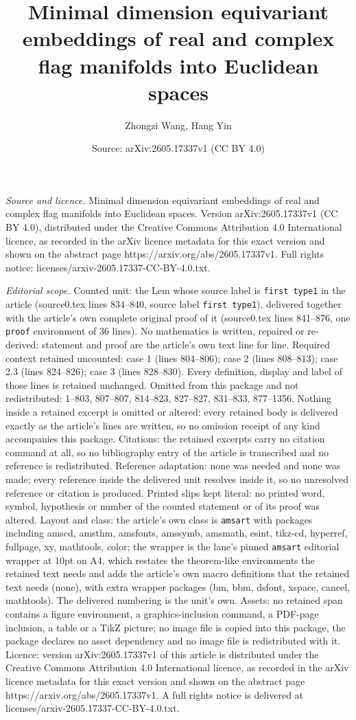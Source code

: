 \documentclass[10pt,a4paper]{amsart}
\title[Minimal dimension equivariant embeddings of real and complex]{Minimal dimension equivariant embeddings of real and complex flag manifolds into Euclidean spaces}
\author{Zhongzi Wang, Hang Yin}
\date{Source: arXiv:2605.17337v1 (CC BY 4.0)}
\begin{document}
\maketitle

\noindent\emph{Source and licence.} Minimal dimension equivariant embeddings of real and complex flag manifolds into Euclidean spaces. Version arXiv:2605.17337v1 (CC BY 4.0), distributed under the Creative Commons Attribution 4.0 International licence, as recorded in the arXiv licence metadata for this exact version and shown on the abstract page https://arxiv.org/abs/2605.17337v1. Full rights notice: licenses/arxiv-2605.17337-CC-BY-4.0.txt.\par\smallskip

\noindent\textit{Editorial scope.} Counted unit: the Lem whose source label is \texttt{first type1} in the article (source0.tex lines 834--840, source label \texttt{first type1}), delivered together with the article's own complete original proof of it (source0.tex lines 841--876, one \texttt{proof} environment of 36 lines). No mathematics is written, repaired or re-derived: statement and proof are the article's own text line for line. Required context retained uncounted: case 1 (lines 804--806); case 2 (lines 808--813); case 2.3 (lines 824--826); case 3 (lines 828--830). Every definition, display and label of those lines is retained unchanged. Omitted from this package and not redistributed: 1--803, 807--807, 814--823, 827--827, 831--833, 877--1356. Nothing inside a retained excerpt is omitted or altered: every retained body is delivered exactly as the article's lines are written, so no omission receipt of any kind accompanies this package. Citations: the retained excerpts carry no citation command at all, so no bibliography entry of the article is transcribed and no reference is redistributed. Reference adaptation: none was needed and none was made; every reference inside the delivered unit resolves inside it, so no unresolved reference or citation is produced. Printed slips kept literal: no printed word, symbol, hypothesis or number of the counted statement or of its proof was altered. Layout and class: the article's own class is \texttt{amsart} with packages including amscd, amsthm, amsfonts, amssymb, amsmath, esint, tikz-cd, hyperref, fullpage, xy, mathtools, color; the wrapper is the lane's pinned \texttt{amsart} editorial wrapper at 10pt on A4, which restates the theorem-like environments the retained text needs and adds the article's own macro definitions that the retained text needs (none), with extra wrapper packages (bm, bbm, dsfont, xspace, cancel, mathtools). The delivered numbering is the unit's own. Assets: no retained span contains a figure environment, a graphics-inclusion command, a PDF-page inclusion, a table or a TikZ picture; no image file is copied into this package, the package declares no asset dependency and no image file is redistributed with it. Licence: version arXiv:2605.17337v1 of this article is distributed under the Creative Commons Attribution 4.0 International licence, as recorded in the arXiv licence metadata for this exact version and shown on the abstract page https://arxiv.org/abs/2605.17337v1. A full rights notice is delivered at licenses/arxiv-2605.17337-CC-BY-4.0.txt. 
\end{document}
